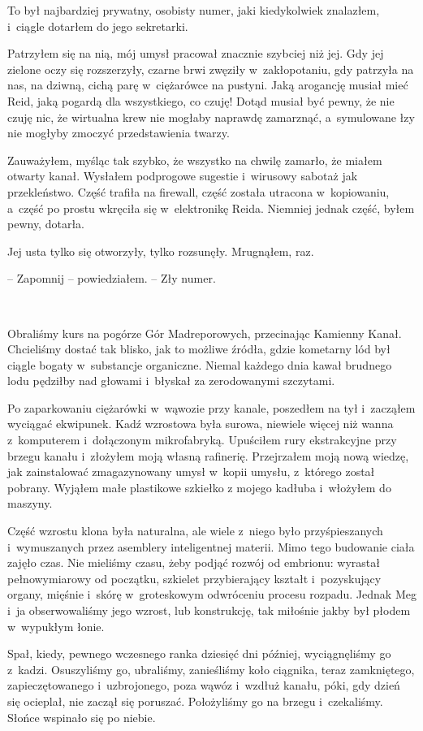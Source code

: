 \documentclass[oneside,polish,11pt,sfheadings]{mwbk}
\begin{document}
To był najbardziej prywatny, osobisty numer, jaki kiedykolwiek
znalazłem, i~ciągle dotarłem do jego sekretarki.

Patrzyłem się na nią, mój umysł pracował znacznie szybciej niż jej. Gdy
jej zielone oczy się rozszerzyły, czarne brwi zwęziły w~zakłopotaniu,
gdy patrzyła na nas, na dziwną, cichą parę w~ciężarówce na pustyni. Jaką
arogancję musiał mieć Reid, jaką pogardą dla wszystkiego, co czuję!
Dotąd musiał być pewny, że nie czuję nic, że wirtualna krew nie mogłaby
naprawdę zamarznąć, a~symulowane łzy nie mogłyby zmoczyć przedstawienia
twarzy.

Zauważyłem, myśląc tak szybko, że wszystko na chwilę zamarło, że miałem
otwarty kanał. Wysłałem podprogowe sugestie i~wirusowy sabotaż jak
przekleństwo. Część trafiła na firewall, część została utracona w~kopiowaniu, a~część po prostu wkręciła się w~elektronikę Reida. Niemniej
jednak część, byłem pewny, dotarła.

Jej usta tylko się otworzyły, tylko rozsunęły. Mrugnąłem, raz.

-- Zapomnij -- powiedziałem. -- Zły numer.

~

Obraliśmy kurs na pogórze Gór Madreporowych, przecinając Kamienny Kanał.
Chcieliśmy dostać tak blisko, jak to możliwe źródła, gdzie kometarny lód
był ciągle bogaty w~substancje organiczne. Niemal każdego dnia kawał
brudnego lodu pędziłby nad głowami i~błyskał za zerodowanymi szczytami.

Po zaparkowaniu ciężarówki w~wąwozie przy kanale, poszedłem na tył i~zacząłem wyciągać ekwipunek. Kadź wzrostowa była surowa, niewiele więcej
niż wanna z~komputerem i~dołączonym mikrofabryką. Upuściłem rury
ekstrakcyjne przy brzegu kanału i~złożyłem moją własną rafinerię.
Przejrzałem moją nową wiedzę, jak zainstalować zmagazynowany umysł w~kopii umysłu, z~którego został pobrany. Wyjąłem małe plastikowe szkiełko
z mojego kadłuba i~włożyłem do maszyny.

Część wzrostu klona była naturalna, ale wiele z~niego było
przyśpieszanych i~wymuszanych przez asemblery inteligentnej materii.
Mimo tego budowanie ciała zajęło czas. Nie mieliśmy czasu, żeby podjąć
rozwój od embrionu: wyrastał pełnowymiarowy od początku, szkielet
przybierający kształt i~pozyskujący organy, mięśnie i~skórę w~groteskowym odwróceniu procesu rozpadu. Jednak Meg i~ja obserwowaliśmy
jego wzrost, lub konstrukcję, tak miłośnie jakby był płodem w~wypukłym
łonie.

Spał, kiedy, pewnego wczesnego ranka dziesięć dni później, wyciągnęliśmy
go z~kadzi. Osuszyliśmy go, ubraliśmy, zanieśliśmy koło ciągnika, teraz
zamkniętego, zapieczętowanego i~uzbrojonego, poza wąwóz i~wzdłuż kanału,
póki, gdy dzień się ocieplał, nie zaczął się poruszać. Położyliśmy go na
brzegu i~czekaliśmy. Słońce wspinało się po niebie.
\end{document}
